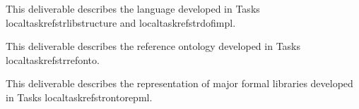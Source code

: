 \begin{workpackage}
\begin{tasklist}

\end{tasklist}


\begin{wpdelivs}
  \begin{wpdeliv}[due=18,miles=???,id=deliv-str-framework,dissem=PU,nature=DEM,lead=Sac]
  	{This deliverable describes the language developed in Tasks localtaskref{strlibstructure} and localtaskref{strdofimpl}.}
  \end{wpdeliv}
  \begin{wpdeliv}[due=36,miles=???,id=deliv-str-ontology,dissem=PU,nature=DEM,lead=Sac]
  	{This deliverable describes the reference ontology developed in Tasks localtaskref{strrefonto}.}
  \end{wpdeliv}
  \begin{wpdeliv}[due=48,miles=???,id=deliv-str-libraries,dissem=PU,nature=DEM,lead=Fau]
  	{This deliverable describes the representation of major formal libraries developed in Tasks localtaskref{strontorepml}.}
  \end{wpdeliv}
\end{wpdelivs}




\end{workpackage}
